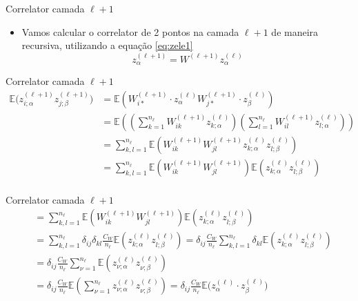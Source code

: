 \documentclass{beamer}
\newcommand{\EE}{\mathbb{E}}
\newcommand{\aaA}{\alpha}
\newcommand{\aaB}{\beta}
\def\eell{{(\ell)}}
\def\eellum{{(\ell+1)}}
\begin{document}
\begin{frame}{Correlator camada $\ell+1$}
	\begin{itemize}
		\item Vamos calcular o correlator de 2 pontos na camada $\ell+1$ de maneira recursiva, utilizando a equação \eqref{eq:zele1}
		\begin{equation*}\tag{3.2'}
			z^\eellum_{\alpha} = W^\eellum z^\eell_\alpha
		\end{equation*}
	\end{itemize}
\end{frame}

\begin{frame}{Correlator camada $\ell + 1$}
	\begin{align*}
		\EE\big(z^\eellum_{i;\aaA} z^\eellum_{j;\aaB}\big) &= 
		\EE\left(W^\eellum_{i*}\cdot z^\eell_{\aaA}W^\eellum_{j*}\cdot z^\eell_{\aaB} \right)  \\
		&=\EE\left( \left(\sum_{k=1}^{n_\ell} W^\eellum_{ik}z^\eell_{k;\aaA}\right)
		\left(\sum_{l=1}^{n_\ell} W^\eellum_{il}z^\eell_{l;\aaA}\right) \right)\\
		&=\sum_{k,l=1}^{n_\ell} \EE\left(W^\eellum_{ik}W^\eellum_{jl}z^\eell_{k;\aaA}z^\eell_{l;\aaB} \right)\\
		&=\sum_{k,l=1}^{n_\ell} \EE\left(W^\eellum_{ik}W^\eellum_{jl}\right) \EE\left(z^\eell_{k;\aaA}z^\eell_{l;\aaB} \right)\\
	\end{align*}
\end{frame}

\begin{frame}{Correlator camada $\ell+1$}
	\begin{align*}
		&=\sum_{k,l=1}^{n_\ell} \EE\left(W^\eellum_{ik}W^\eellum_{jl}\right) \EE\left(z^\eell_{k;\aaA}z^\eell_{l;\aaB} \right)\\
		&=\sum_{k,l=1}^{n_\ell} \delta_{ij}\delta_{kl}\frac{C_W}{n_\ell} \EE\left(z^\eell_{k;\aaA}z^\eell_{l;\aaB} \right) 
		=\delta_{ij}\frac{C_W}{n_\ell}\sum_{k,l=1}^{n_\ell} \delta_{kl} \EE\left(z^\eell_{k;\aaA}z^\eell_{l;\aaB} \right) \\
		&= \delta_{ij}\frac{C_W}{n_\ell} \sum_{\nu=1}^{n_\ell} \EE\left(z^\eell_{\nu;\aaA}z^\eell_{\nu;\aaB} \right) \\
		&= \delta_{ij}\frac{C_W}{n_\ell}\EE\left( \sum_{\nu=1}^{n_\ell}z^\eell_{\nu;\aaA}z^\eell_{\nu;\aaB} \right) 
		= \delta_{ij}\frac{C_W}{n_\ell} \EE\big(z^\eell_{\aaA}\cdot  z^\eell_{\aaB}\big)\tag{3.11}\label{eq:correlatorGl}
	\end{align*}
\end{frame}
	 
\end{document}
